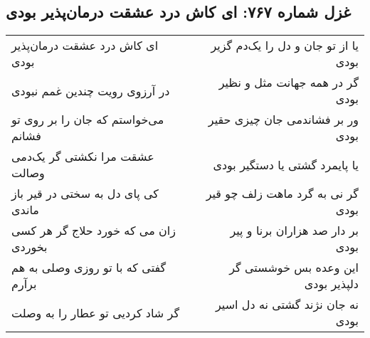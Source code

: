 \begin{center}
\section*{غزل شماره ۷۶۷: ای کاش درد عشقت درمان‌پذیر بودی}
\label{sec:767}
\begin{longtable}{l p{0.5cm} r}
ای کاش درد عشقت درمان‌پذیر بودی
&&
یا از تو جان و دل را یک‌دم گزیر بودی
\\
در آرزوی رویت چندین غمم نبودی
&&
گر در همه جهانت مثل و نظیر بودی
\\
می‌خواستم که جان را بر روی تو فشانم
&&
ور بر فشاندمی جان چیزی حقیر بودی
\\
عشقت مرا نکشتی گر یک‌دمی وصالت
&&
یا پایمرد گشتی یا دستگیر بودی
\\
کی پای دل به سختی در قیر باز ماندی
&&
گر نی به گرد ماهت زلف چو قیر بودی
\\
زان می که خورد حلاج گر هر کسی بخوردی
&&
بر دار صد هزاران برنا و پیر بودی
\\
گفتی که با تو روزی وصلی به هم برآرم
&&
این وعده بس خوشستی گر دلپذیر بودی
\\
گر شاد کردیی تو عطار را به وصلت
&&
نه جان نژند گشتی نه دل اسیر بودی
\\
\end{longtable}
\end{center}
